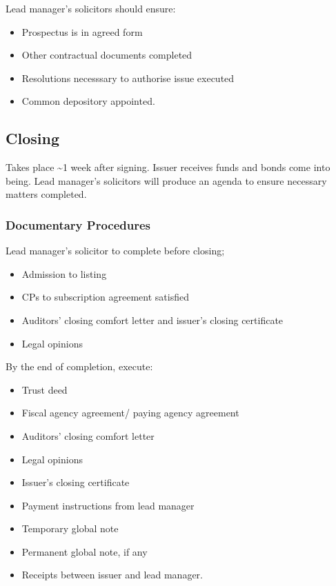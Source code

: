 \documentclass[
]{article}
\providecommand{\tightlist}{%
  \setlength{\itemsep}{0pt}\setlength{\parskip}{0pt}}
\begin{document}
Lead manager's solicitors should ensure:

\begin{itemize}
\tightlist
\item
  Prospectus is in agreed form
\item
  Other contractual documents completed
\item
  Resolutions necesssary to authorise issue executed
\item
  Common depository appointed.
\end{itemize}

\hypertarget{closing}{%
\subsection{Closing}\label{closing}}

Takes place \textasciitilde1 week after signing. Issuer receives funds
and bonds come into being. Lead manager's solicitors will produce an
agenda to ensure necessary matters completed.

\hypertarget{documentary-procedures}{%
\subsubsection{Documentary Procedures}\label{documentary-procedures}}

Lead manager's solicitor to complete before closing;

\begin{itemize}
\tightlist
\item
  Admission to listing
\item
  CPs to subscription agreement satisfied
\item
  Auditors' closing comfort letter and issuer's closing certificate
\item
  Legal opinions
\end{itemize}

By the end of completion, execute:

\begin{itemize}
\tightlist
\item
  Trust deed
\item
  Fiscal agency agreement/ paying agency agreement
\item
  Auditors' closing comfort letter
\item
  Legal opinions
\item
  Issuer's closing certificate
\item
  Payment instructions from lead manager
\item
  Temporary global note
\item
  Permanent global note, if any
\item
  Receipts between issuer and lead manager.
\end{itemize}
\end{document}
